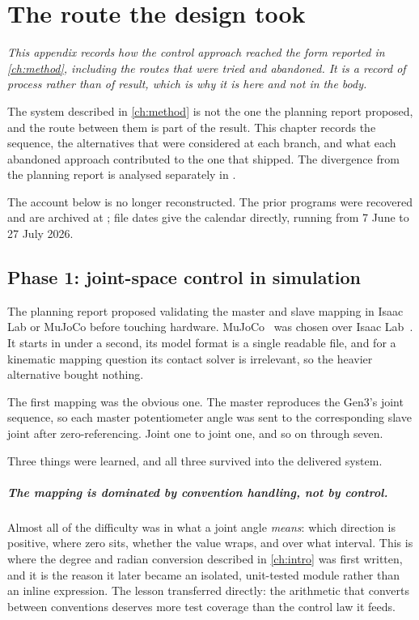 \chapter{The route the design took}
\label{app:development}

\noindent\emph{This appendix records how the control approach reached the
form reported in \cref{ch:method}, including the routes that were tried and
abandoned. It is a record of process rather than of result, which is why it
is here and not in the body.}

\label{ch:development}

The system described in \cref{ch:method} is not the one the planning report
proposed, and the route between them is part of the result. This chapter
records the sequence, the alternatives that were considered at each branch,
and what each abandoned approach contributed to the one that shipped. The
divergence from the planning report is analysed separately in
.

The account below is no longer reconstructed. The prior programs were
recovered and are archived at ;
file dates give the calendar directly, running from 7 June to 27 July 2026.

\section{Phase 1: joint-space control in simulation}

The planning report proposed validating the master and slave mapping in Isaac
Lab or MuJoCo before touching hardware. MuJoCo~\cite{todorov2012mujoco} was chosen over Isaac
Lab~\cite{isaaclab}. It starts in under a second, its model format
is a single readable file, and for a kinematic mapping question its contact
solver is irrelevant, so the heavier alternative bought nothing.

The first mapping was the obvious one. The master reproduces the Gen3's joint
sequence, so each master potentiometer angle was sent to the corresponding
slave joint after zero-referencing. Joint one to joint one, and so on through
seven.

Three things were learned, and all three survived into the delivered system.

\paragraph{The mapping is dominated by convention handling, not by control.}
Almost all of the difficulty was in what a joint angle \emph{means}: which
direction is positive, where zero sits, whether the value wraps, and over what
interval. This is where the degree and radian conversion described in
\cref{ch:intro} was first written, and it is the reason it later became an
isolated, unit-tested module rather than an inline expression. The lesson
transferred directly: the arithmetic that converts between conventions
deserves more test coverage than the control law it feeds.

